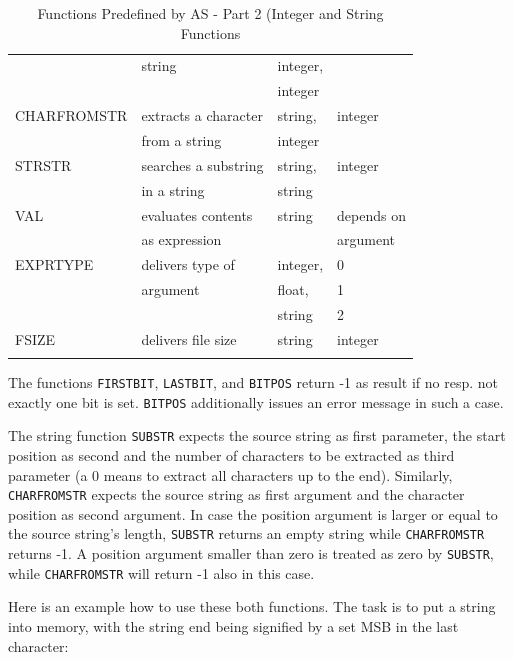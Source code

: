 \documentclass[12pt,twoside]{report}
\newcommand{\tty}[1]{{\tt #1}}
\newcommand{\asname}{{AS}}
\begin{document}
\begin{center}
\begin{longtable}{|l|l|l|l|}
            & string               & integer,             & \\
            &                      & integer              & \\
CHARFROMSTR & extracts a character & string,              & integer \\
            & from a string        & integer              & \\
STRSTR      & searches a substring & string,              & integer \\
            & in a string          & string               & \\
VAL         & evaluates contents   & string               & depends on \\
            & as expression        &                      & argument \\
EXPRTYPE    & delivers type of     & integer,             & 0 \\
            & argument             & float,               & 1 \\
            &                      & string               & 2 \\
FSIZE       & delivers file size   & string               & integer \\
\hline
\caption{Functions Predefined by \asname{} - Part 2 (Integer and
         String Functions \label{TabFuncs2}}
\end{longtable}\end{center}
The functions \tty{FIRSTBIT}, \tty{LASTBIT}, and \tty{BITPOS} return -1 as
result if no resp. not exactly one bit is set.  \tty{BITPOS} additionally
issues an error message in such a case.

The string function \tty{SUBSTR} expects the source string as first
parameter, the start position as second and the number of characters to be
extracted as third parameter (a 0 means to extract all characters up to
the end).  Similarly, \tty{CHARFROMSTR} expects the source string as
first argument and the character position as second argument.  In case the
position argument is larger or equal to the source string's length,
\tty{SUBSTR} returns an empty string while \tty{CHARFROMSTR} returns -1.
A position argument smaller than zero is treated as zero by \tty{SUBSTR},
while \tty{CHARFROMSTR} will return -1 also in this case.

Here is an example how to use these both functions.  The task is to put a
string into memory, with the string end being signified by a set MSB in
the last character:
\end{document}
